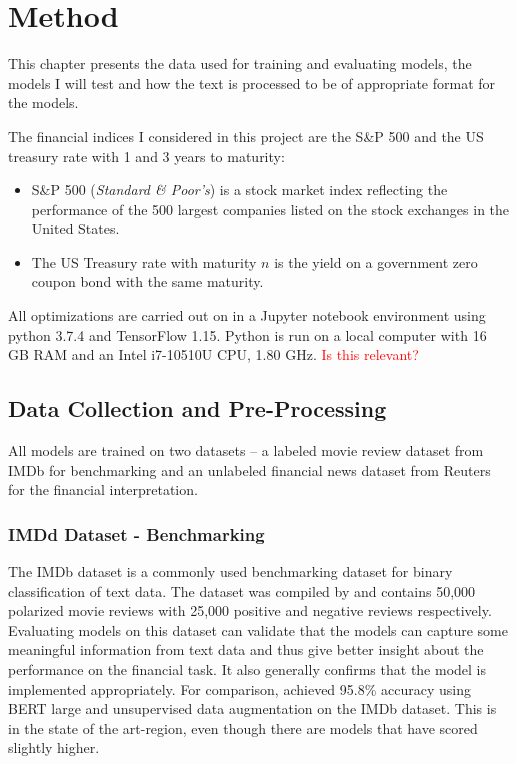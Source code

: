 \chapter{Method}

This chapter presents the data used for training and evaluating models, the models I will test and how the text is processed to be of appropriate format for the models. 

The financial indices I considered in this project are the S\&P 500 and the US treasury rate with 1 and 3 years to maturity:
\begin{itemize}
    \item S\&P 500 (\textit{Standard \& Poor's}) is a stock market index reflecting the performance of the 500 largest companies listed on the stock exchanges in the United States.
    \item The US Treasury rate with maturity $n$ is the yield on a government zero coupon bond with the same maturity. 
\end{itemize}

All optimizations are carried out on in a Jupyter notebook environment using python 3.7.4 and TensorFlow 1.15. Python is run on a local computer with 16 GB RAM and an Intel i7-10510U CPU, 1.80 GHz. 
\textcolor{red}{Is this relevant? }

\section{Data Collection and Pre-Processing}

All models are trained on two datasets -- a labeled movie review dataset from IMDb for benchmarking and an unlabeled financial news dataset from Reuters for the financial interpretation. 

\subsection{IMDd Dataset - Benchmarking}
The IMDb dataset is a commonly used benchmarking dataset for binary classification of text data. The dataset was compiled by \citet{maas-EtAl:2011:ACL-HLT2011} and contains 50,000 polarized movie reviews with 25,000 positive and negative reviews respectively. Evaluating models on this dataset can validate that the models can capture some meaningful information from text data and thus give better insight about the performance on the financial task. It also  generally confirms that the model is implemented appropriately. For comparison, \citeauthor{xie2019unsupervised} achieved 95.8\% accuracy using BERT large and unsupervised data augmentation on the IMDb dataset. This is in the state of the art-region, even though there are models that have scored slightly higher. 

